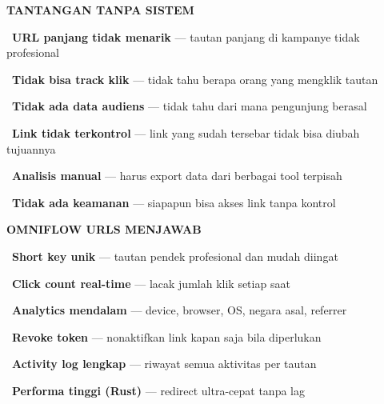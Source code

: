 \documentclass[a4paper]{article}
\begin{document}
\noindent
\begin{minipage}[t]{0.485\textwidth}
    \colorbox{RedLight}{%
        \begin{minipage}{\dimexpr\textwidth-2\fboxsep\relax}
            {\fontsize{10}{13}\selectfont\bfseries\color{RedText} TANTANGAN TANPA SISTEM}
        \end{minipage}}\par
    \vspace{4pt}

    {\fontsize{9.5}{13}\selectfont\color{TextDark}%
    \textbullet\ \textbf{URL panjang tidak menarik} --- tautan panjang di kampanye tidak profesional\par\vspace{4pt}%
    \textbullet\ \textbf{Tidak bisa track klik} --- tidak tahu berapa orang yang mengklik tautan\par\vspace{4pt}%
    \textbullet\ \textbf{Tidak ada data audiens} --- tidak tahu dari mana pengunjung berasal\par\vspace{4pt}%
    \textbullet\ \textbf{Link tidak terkontrol} --- link yang sudah tersebar tidak bisa diubah tujuannya\par\vspace{4pt}%
    \textbullet\ \textbf{Analisis manual} --- harus export data dari berbagai tool terpisah\par\vspace{4pt}%
    \textbullet\ \textbf{Tidak ada keamanan} --- siapapun bisa akses link tanpa kontrol}%
\end{minipage}%
\hfill%
\begin{minipage}[t]{0.485\textwidth}
    \colorbox{CyanPrimary}{%
        \begin{minipage}{\dimexpr\textwidth-2\fboxsep\relax}
            {\fontsize{10}{13}\selectfont\bfseries\color{White} OMNIFLOW URLS MENJAWAB}
        \end{minipage}}\par
    \vspace{4pt}

    {\fontsize{9.5}{13}\selectfont\color{TextDark}%
    \textbullet\ \textbf{Short key unik} --- tautan pendek profesional dan mudah diingat\par\vspace{4pt}%
    \textbullet\ \textbf{Click count real-time} --- lacak jumlah klik setiap saat\par\vspace{4pt}%
    \textbullet\ \textbf{Analytics mendalam} --- device, browser, OS, negara asal, referrer\par\vspace{4pt}%
    \textbullet\ \textbf{Revoke token} --- nonaktifkan link kapan saja bila diperlukan\par\vspace{4pt}%
    \textbullet\ \textbf{Activity log lengkap} --- riwayat semua aktivitas per tautan\par\vspace{4pt}%
    \textbullet\ \textbf{Performa tinggi (Rust)} --- redirect ultra-cepat tanpa lag}%
\end{minipage}
\end{document}
